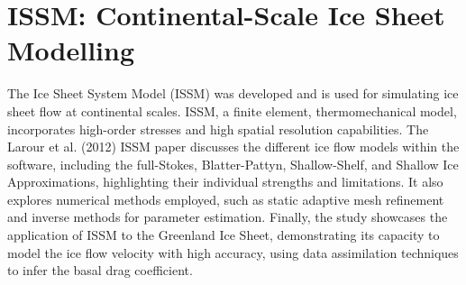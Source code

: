 \section*{ISSM: Continental-Scale Ice Sheet Modelling}
The Ice Sheet System Model (ISSM) was developed and is used for simulating ice sheet flow at continental scales. ISSM, a finite element, thermomechanical model, incorporates high-order stresses and high spatial resolution capabilities\cite{ISSM}. The Larour et al. (2012) ISSM paper discusses the different ice flow models within the software, including the full-Stokes, Blatter-Pattyn, Shallow-Shelf, and Shallow Ice Approximations, highlighting their individual strengths and limitations. It also explores numerical methods employed, such as static adaptive mesh refinement and inverse methods for parameter estimation. Finally, the study showcases the application of ISSM to the Greenland Ice Sheet, demonstrating its capacity to model the ice flow velocity with high accuracy, using data assimilation techniques to infer the basal drag coefficient.










